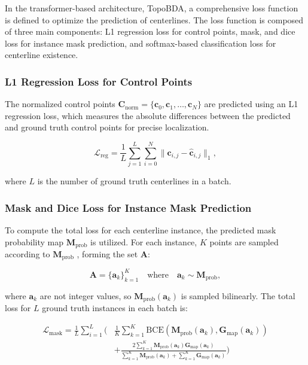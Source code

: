 In the transformer-based architecture, TopoBDA, a comprehensive loss function is defined to optimize the prediction of centerlines. The loss function is composed of three main components: L1 regression loss for control points, mask, and dice loss for instance mask prediction, and softmax-based classification loss for centerline existence.

\subsubsection{L1 Regression Loss for Control Points}

The normalized control points \( \mathbf{C}_{\text{norm}} = \{\mathbf{c}_0, \mathbf{c}_1, \ldots, \mathbf{c}_N\} \) are predicted using an L1 regression loss, which measures the absolute differences between the predicted and ground truth control points for precise localization.

\begin{equation}
\mathcal{L}_{\text{reg}} = \frac{1}{L} \sum_{j=1}^{L} \sum_{i=0}^{N} \| \mathbf{c}_{i,j} - \hat{\mathbf{c}}_{i,j} \|_1,
\end{equation}

where \( L \) is the number of ground truth centerlines in a batch.



\subsubsection{Mask and Dice Loss for Instance Mask Prediction}

To compute the total loss for each centerline instance, the predicted mask probability map \( \mathbf{M}_{\text{prob}} \) is utilized. For each instance, \( K \) points are sampled according to \( \mathbf{M}_{\text{prob}} \) \cite{kirillov2020pointrend}, forming the set \( \mathbf{A} \):

\[
\mathbf{A} = \{\mathbf{a}_k\}_{k=1}^K \quad \text{where} \quad \mathbf{a}_k \sim \mathbf{M}_{\text{prob}},
\]

where \( \mathbf{a}_k \) are not integer values, so \( \mathbf{M}_{\text{prob}}(\mathbf{a}_k) \) is sampled bilinearly. The total loss for \( L \) ground truth instances in each batch is:

\begin{equation}
\begin{aligned}
\mathcal{L}_{\text{mask}} = \frac{1}{L} \sum_{i=1}^L \Bigg( &\frac{1}{K} \sum_{k=1}^K \text{BCE}(\mathbf{M}_{\text{prob}}(\mathbf{a}_k), \mathbf{G}_{\text{map}}(\mathbf{a}_k)) \\
&+ \frac{2 \sum_{k=1}^K \mathbf{M}_{\text{prob}}(\mathbf{a}_k) \mathbf{G}_{\text{map}}(\mathbf{a}_k)}{\sum_{k=1}^K \mathbf{M}_{\text{prob}}(\mathbf{a}_k) + \sum_{k=1}^K \mathbf{G}_{\text{map}}(\mathbf{a}_k)} \Bigg)
\end{aligned}
\label{eq: mask_loss}
\end{equation}

